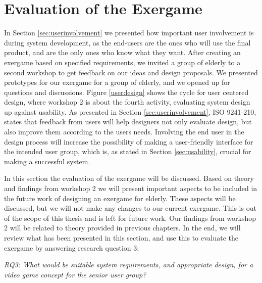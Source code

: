 \section{Evaluation of the Exergame}
\label{sec:discfindings2}
In Section \ref{sec:userinvolvement} we presented how important user involvement is during system development, as the end-users are the ones who will use the final product, and are the only ones who know what they want. After creating an exergame based on specified requirements, we invited a group of elderly to a second workshop to get feedback on our ideas and design proposals. We presented prototypes for our exergame for a group of elderly, and we opened up for questions and discussions. Figure \ref{userdesign} shows the cycle for user centered design, where workshop 2 is about the fourth activity, evaluating system design up against usability. As presented in Section \ref{sec:userinvolvement}, ISO 9241-210, states that feedback from users will help designers not only evaluate design, but also improve them according to the users needs. Involving the end user in the design process will increase the possibility of making a user-friendly interface for the intended user group, which is, as stated in Section \ref{sec:usability}, crucial for making a successful system. 

In this section the evaluation of the exergame will be discussed. Based on theory and findings from workshop 2 we will present important aspects to be included in the future work of designing an exergame for elderly. These aspects will be discussed, but we will not make any changes to our current exergame. This is out of the scope of this thesis and is left for future work. Our findings from workshop 2 will be related to theory provided in previous chapters. In the end, we will review what has been presented in this section, and use this to evaluate the exergame by answering research question 3:

\emph{RQ3: What would be suitable system requirements, and appropriate design, for a video game concept for the senior user group?}

